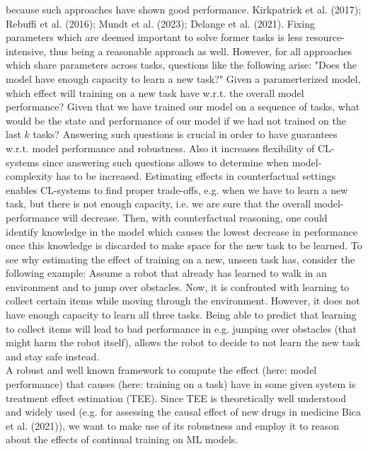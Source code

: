 \documentclass[10pt]{article}
\begin{document}
because such approaches have shown good performance. Kirkpatrick et al. (2017); Rebuffi et al. (2016); Mundt et al. (2023); Delange et al. (2021). Fixing parameters which are deemed important to solve former tasks is less resource-intensive, thus being a reasonable approach as well. However, for all approaches which share parameters across tasks, questions like the following arise: "Does the model have enough capacity to learn a new task?" Given a paramerterized model, which effect will training on a new task have w.r.t. the overall model performance? Given that we have trained our model on a sequence of tasks, what would be the state and performance of our model if we had not trained on the last $k$ tasks? Answering such questions is crucial in order to have guarantees w.r.t. model performance and robustness. Also it increases flexibility of CL-systems since answering such questions allows to determine when model-complexity has to be increased. Estimating effects in counterfactual settings enables CL-systems to find proper trade-offs, e.g. when we have to learn a new task, but there is not enough capacity, i.e. we are sure that the overall model-performance will decrease. Then, with counterfactual reasoning, one could identify knowledge in the model which causes the lowest decrease in performance once this knowledge is discarded to make space for the new task to be learned. To see why estimating the effect of training on a new, unseen task has, consider the following example: Assume a robot that already has learned to walk in an environment and to jump over obstacles. Now, it is confronted with learning to collect certain items while moving through the environment. However, it does not have enough capacity to learn all three tasks. Being able to predict that learning to collect items will lead to bad performance in e.g. jumping over obstacles (that might harm the robot itself), allows the robot to decide to not learn the new task and stay safe instead.\\
A robust and well known framework to compute the effect (here: model performance) that causes (here: training on a task) have in some given system is treatment effect estimation (TEE). Since TEE is theoretically well understood and widely used (e.g. for assessing the causal effect of new drugs in medicine Bica et al. (2021)), we want to make use of its robustness and employ it to reason about the effects of continual training on ML models.
\end{document}
